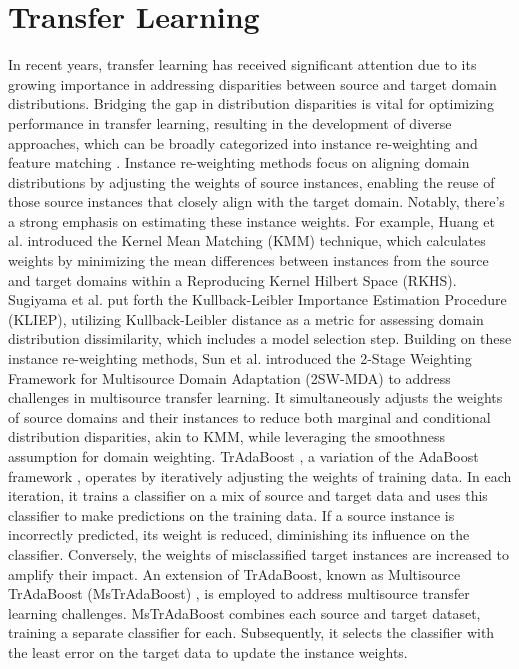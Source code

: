 \section{Transfer Learning} 
\label{sec:3_5_transfer_learning}
In recent years, transfer learning has received significant attention due to its growing importance in addressing disparities between source and target domain distributions. Bridging the gap in distribution disparities is vital for optimizing performance in transfer learning, resulting in the development of diverse approaches, which can be broadly categorized into instance re-weighting and feature matching \cite{long2013transfer}. Instance re-weighting methods focus on aligning domain distributions by adjusting the weights of source instances, enabling the reuse of those source instances that closely align with the target domain. Notably, there's a strong emphasis on estimating these instance weights. For example, Huang et al. \cite{long2014transfer} introduced the Kernel Mean Matching (KMM) technique, which calculates weights by minimizing the mean differences between instances from the source and target domains within a Reproducing Kernel Hilbert Space (RKHS). Sugiyama et al. \cite{sun2011two} put forth the Kullback-Leibler Importance Estimation Procedure (KLIEP), utilizing Kullback-Leibler distance as a metric for assessing domain distribution dissimilarity, which includes a model selection step. Building on these instance re-weighting methods, Sun et al. \cite{dai2007boosting} introduced the 2-Stage Weighting Framework for Multisource Domain Adaptation (2SW-MDA) to address challenges in multisource transfer learning. It simultaneously adjusts the weights of source domains and their instances to reduce both marginal and conditional distribution disparities, akin to KMM, while leveraging the smoothness assumption for domain weighting. TrAdaBoost \cite{freund1996experiments}, a variation of the AdaBoost framework \cite{yao2010boosting}, operates by iteratively adjusting the weights of training data. In each iteration, it trains a classifier on a mix of source and target data and uses this classifier to make predictions on the training data. If a source instance is incorrectly predicted, its weight is reduced, diminishing its influence on the classifier. Conversely, the weights of misclassified target instances are increased to amplify their impact. An extension of TrAdaBoost, known as Multisource TrAdaBoost (MsTrAdaBoost) \cite{sun2016return}, is employed to address multisource transfer learning challenges. MsTrAdaBoost combines each source and target dataset, training a separate classifier for each. Subsequently, it selects the classifier with the least error on the target data to update the instance weights.

